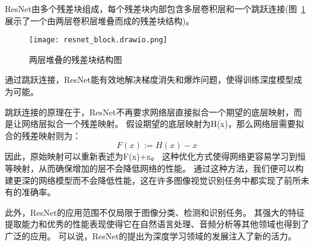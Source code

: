 ResNet由多个残差块组成，每个残差块内部包含多层卷积层和一个跳跃连接(图~\ref{fig:resnet_structure}展示了一个由两层卷积层堆叠而成的残差块结构)。
\begin{figure}[h]
  \centering
  \texttt{[image: resnet\_block.drawio.png]}
  \caption{两层堆叠的残差块结构图}
  \label{fig:resnet_structure}
\end{figure}
通过跳跃连接，ResNet能有效地解决梯度消失和爆炸问题，使得训练深度模型成为可能。


跳跃连接的原理在于，ResNet不再要求网络层直接拟合一个期望的底层映射，而是让网络层拟合一个残差映射。
假设期望的底层映射为H(x)，那么网络层需要拟合的残差映射则为：
\begin{equation}
  \label{eq:residual_mapping}
  F(x) := H(x) - x
\end{equation}
因此，原始映射可以重新表述为F(x)+x。
这种优化方式使得网络更容易学习到恒等映射，从而确保增加的层不会降低网络的性能。
通过这种方法，我们便可以构建更深的网络模型而不会降低性能，这在许多图像视觉识别任务中都实现了前所未有的准确率。


此外，ResNet的应用范围不仅局限于图像分类、检测和识别任务。
其强大的特征提取能力和优秀的性能表现使得它在自然语言处理、音频分析等其他领域也得到了广泛的应用。
可以说，ResNet的提出为深度学习领域的发展注入了新的活力。






